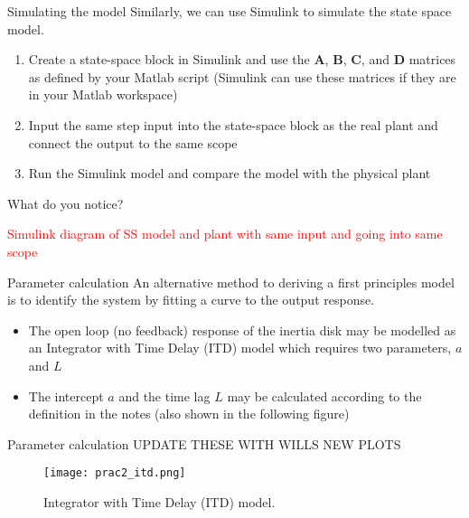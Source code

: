 \documentclass[9pt]{beamer-control}
\begin{document}
\begin{frame}{Simulating the model}
Similarly, we can use Simulink to simulate the state space model.
\begin{enumerate}
	\item Create a state-space block in Simulink and use the $\mathbf{A}$, $\mathbf{B}$, $\mathbf{C}$, and $\mathbf{D}$ matrices as defined by your Matlab script (Simulink can use these matrices if they are in your Matlab workspace)
	\item Input the same step input into the state-space block as the real plant and connect the output to the same scope
	\item Run the Simulink model and compare the model with the physical plant
\end{enumerate}

What do you notice?


\textcolor{red}{Simulink diagram of SS model and plant with same input and going into same scope}

\end{frame}





\begin{frame}{Parameter calculation}
An alternative method to deriving a first principles model is to identify the system by fitting a curve to the output response. 

\begin{itemize}
	\item The open loop (no feedback) response of the inertia disk may be modelled as an Integrator with Time Delay (ITD) model which requires two parameters, $a$ and $L$
	\item The intercept $a$ and the time lag $L$ may be calculated according to the definition in the notes (also shown in the following figure)
\end{itemize}


\end{frame}

\begin{frame}{Parameter calculation}
	UPDATE THESE WITH WILLS NEW PLOTS
	\begin{figure}
		\centering
		\texttt{[image: prac2\_itd.png]}
		\caption{Integrator with Time Delay (ITD) model.}
	\end{figure}
\end{frame}
\end{document}
